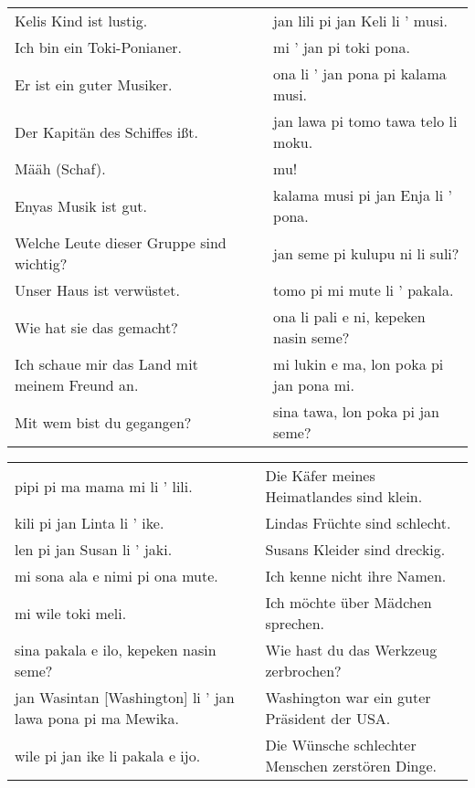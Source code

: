 \begin{supertabular}{p{5,5cm}|ll}
Kelis Kind ist lustig.  && jan lili pi jan Keli li ' musi. \\ %
Ich bin ein Toki-Ponianer.  && mi ' jan pi toki pona. \\ %
Er ist ein guter Musiker.  && ona li ' jan pona pi kalama musi. \\ %
Der Kapitän des Schiffes ißt.  && jan lawa pi tomo tawa telo li moku. \\ %
Määh (Schaf).  && mu! \\ %
Enyas Musik ist gut.  && kalama musi pi jan Enja li ' pona. \\ %
Welche Leute dieser Gruppe sind wichtig?  && jan seme pi kulupu ni li suli? \\ %
Unser Haus ist verwüstet.  && tomo pi mi mute li ' pakala. \\ %
Wie hat sie das gemacht?   && ona li pali e ni, kepeken nasin seme? \\ %
Ich schaue mir das Land mit meinem Freund an.  && mi lukin e ma, lon poka pi jan pona mi. \\ %
Mit wem bist du gegangen?  && sina tawa, lon poka pi jan seme? \\ %
\end{supertabular}  

\begin{supertabular}{p{5,5cm}|ll}
pipi pi ma mama mi li ' lili.  && Die Käfer meines Heimatlandes sind klein.\\ 
kili pi jan Linta li ' ike.  && Lindas Früchte sind schlecht. \\
len pi jan Susan li ' jaki.  && Susans Kleider sind dreckig. \\
mi sona ala e nimi pi ona mute.  && Ich kenne nicht ihre Namen. \\
mi wile toki meli.  && Ich möchte über Mädchen sprechen. \\
sina pakala e ilo, kepeken nasin seme?  && Wie hast du das Werkzeug zerbrochen? \\
jan Wasintan [Washington] li ' jan lawa pona pi ma Mewika.  && Washington war ein guter Präsident der USA. \\
wile pi jan ike li pakala e ijo.  && Die Wünsche schlechter Menschen zerstören Dinge. \\
\end{supertabular}  

